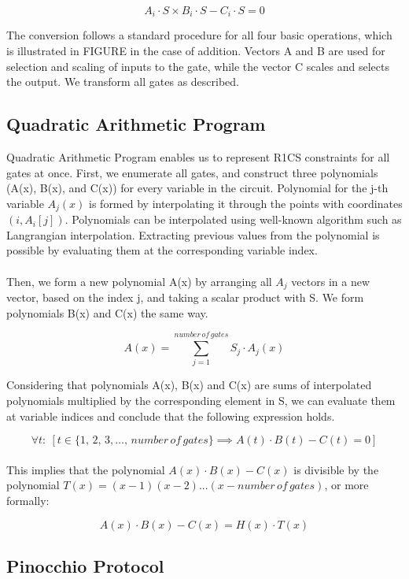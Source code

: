 $$ A_i \cdot S \times B_i \cdot S - C_i \cdot S = 0 $$

The conversion follows a standard procedure for all four basic operations, which is illustrated in FIGURE in the case of addition. Vectors A and B are used for selection and scaling of inputs to the gate, while the vector C scales and selects the output. We transform all gates as described.

\subsection{Quadratic Arithmetic Program}
Quadratic Arithmetic Program enables us to represent R1CS constraints for all gates at once. First, we enumerate all gates, and construct three polynomials (A(x), B(x), and C(x)) for every variable in the circuit. Polynomial for the j-th variable $A_j(x)$ is formed by interpolating it through the points with coordinates $(i, A_i[j])$. 
Polynomials can be interpolated using well-known algorithm such as Langrangian interpolation. Extracting previous values from the polynomial is possible by evaluating them at the corresponding variable index.\\
\\
Then, we form a new polynomial A(x) by arranging all $A_j$ vectors in a new vector, based on the index j, and taking a scalar product with S. We form polynomials B(x) and C(x) the same way.

$$ A(x) = \sum_{j = 1}^{number\,of\,gates} S_j \cdot A_j(x) $$

Considering that polynomials A(x), B(x) and C(x) are sums of interpolated polynomials multiplied by the corresponding element in S, we can evaluate them at variable indices and conclude that the following expression holds.

$$\forall t:\: [t \in \{1,\,2,\,3, \dots ,\,number\,of\,gates\} \implies A(t) \cdot B(t) - C(t) = 0]$$
\\
This implies that the polynomial $A(x) \cdot B(x) - C(x)$ is divisible by the polynomial $T(x) = (x-1)(x-2)...(x-number\,of\,gates)$, or more formally:

$$ A(x) \cdot B(x) - C(x) = H(x) \cdot T(x) $$

\subsection{Pinocchio Protocol}

